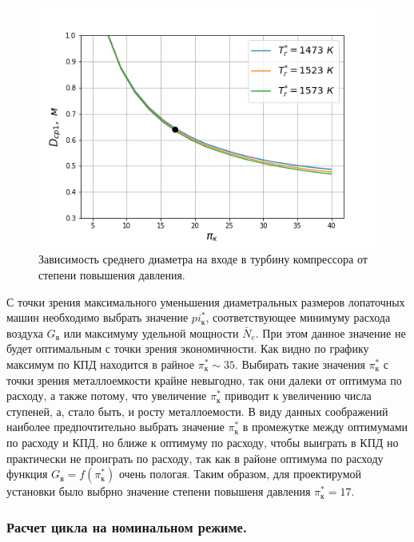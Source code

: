 \documentclass[a4paper,12pt]{article}
\begin{document}
    \begin{figure}[h!]
        \centering
        \includegraphics[scale=0.8]{../plots/cycle_D_av1.png}
        \caption{Зависимость среднего диаметра на входе в турбину компрессора от степени повышения давления.}
        \label{cycle_D_av1}
    \end{figure}

    С точки зрения максимального уменьшения диаметральных размеров лопаточных машин необходимо выбрать
    значение $pi_к^*$, соответствующее минимуму расхода воздуха $G_в$ или максимуму удельной мощности $\bar{N}_e$.
    При этом данное значение не будет оптимальным с точки зрения экономичности.
    Как видно по графику максимум по КПД находится в райное $\pi_к^* \sim 35$.
    Выбирать такие значения $\pi_к^*$ с точки зрения металлоемкости крайне невыгодно, так они далеки от оптимума
    по расходу, а также потому, что увеличение $\pi_к^*$ приводит к увеличению числа ступеней, а, стало быть, и
    росту металлоемости.
    В виду данных соображений наиболее предпочтительно выбрать значение $\pi_к^*$ в промежутке между оптимумами
    по расходу и КПД, но ближе к оптимуму по расходу, чтобы выиграть в КПД но практически не проиграть по расходу,
    так как в районе оптимума по расходу функция $G_в = f(\pi_к^*)$ очень пологая.
    Таким образом, для проектирумой установки было выбрно значение степени повышеня давления $\pi_к^* = 17$.

    \subsubsection{Расчет цикла на номинальном режиме.}
%    
\end{document}
